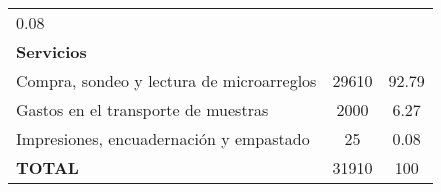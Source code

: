 \documentclass[]{article}
\begin{document}
\begin{longtable}[]{@{}lcc@{}}
\begin{minipage}[t]{0.22\columnwidth}
0.08\strut
\end{minipage}\tabularnewline
\begin{minipage}[t]{0.46\columnwidth}\raggedright\strut
\textbf{Servicios}\strut
\end{minipage} & \begin{minipage}[t]{0.22\columnwidth}\centering\strut
\strut
\end{minipage} & \begin{minipage}[t]{0.22\columnwidth}\centering\strut
\strut
\end{minipage}\tabularnewline
\begin{minipage}[t]{0.46\columnwidth}\raggedright\strut
Compra, sondeo y lectura de microarreglos\strut
\end{minipage} & \begin{minipage}[t]{0.22\columnwidth}\centering\strut
29610\strut
\end{minipage} & \begin{minipage}[t]{0.22\columnwidth}\centering\strut
92.79\strut
\end{minipage}\tabularnewline
\begin{minipage}[t]{0.46\columnwidth}\raggedright\strut
Gastos en el transporte de muestras\strut
\end{minipage} & \begin{minipage}[t]{0.22\columnwidth}\centering\strut
2000\strut
\end{minipage} & \begin{minipage}[t]{0.22\columnwidth}\centering\strut
6.27\strut
\end{minipage}\tabularnewline
\begin{minipage}[t]{0.46\columnwidth}\raggedright\strut
Impresiones, encuadernación y empastado\strut
\end{minipage} & \begin{minipage}[t]{0.22\columnwidth}\centering\strut
25\strut
\end{minipage} & \begin{minipage}[t]{0.22\columnwidth}\centering\strut
0.08\strut
\end{minipage}\tabularnewline
\begin{minipage}[t]{0.46\columnwidth}\raggedright\strut
\textbf{TOTAL}\strut
\end{minipage} & \begin{minipage}[t]{0.22\columnwidth}\centering\strut
31910\strut
\end{minipage} & \begin{minipage}[t]{0.22\columnwidth}\centering\strut
100\strut
\end{minipage}\tabularnewline
\bottomrule
\end{longtable}
\end{document}
